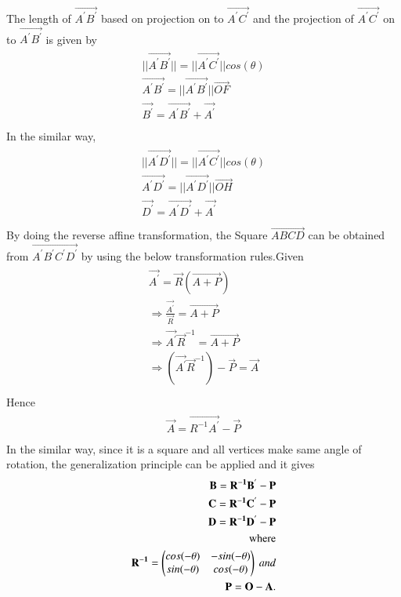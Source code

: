 \documentclass[journal,12pt,twocolumn]{IEEEtran}
\begin{document}
\\
\\
The length of $\vec{A^{'}B^{'}}$ based on projection on to $\vec{A^{'}C^{'}}$ and the projection of $\vec{A^{'}C^{'}}$ on to $\vec{A^{'}B^{'}}$ is given by \\
\begin{align}
\begin{split}
||\vec{A^{'}B^{'}}|| = ||\vec{A^{'}C^{'}}||cos(\theta)\\
\vec{A^{'}B^{'}} = ||\vec{A^{'}B^{'}}||\vec{OF}\\
\vec{B^{'}}=\vec{A^{'}B^{'}}+\vec{A^{'}}\\
\end{split}
\end{align}
In the similar way, 
\begin{align}
\begin{split}
||\vec{A^{'}D^{'}}|| = ||\vec{A^{'}C^{'}}||cos(\theta)\\
\vec{A^{'}D^{'}} = ||\vec{A^{'}D^{'}}||\vec{OH}\\
\vec{D^{'}}=\vec{A^{'}D^{'}}+\vec{A^{'}}\\
\end{split}
\end{align}
By doing the reverse affine transformation, the Square $\vec{ABCD}$ can be obtained from $\vec{A^{'}B^{'}C^{'}D^{'}}$ by using the below transformation rules.Given\\
\begin{align}
\begin{split}
\vec{A^{'}} = \vec{R}(\vec{A+P})\\
\Rightarrow \frac{\vec{A^{'}}}{\vec{R}} = \vec{A+P}\\
\Rightarrow \vec{A^{'}}\vec{R}^{-1} = \vec{A+P}\\
\Rightarrow (\vec{A^{'}}\vec{R}^{-1})-\vec{P} = \vec{A}\\
\end{split}
\end{align}
Hence\\
\begin{align}
\begin{split}
\vec{A} = \vec{R^{-1}A^{'}}-\vec{P}\\
\end{split}
\end{align}
In the similar way, since it is a square and all vertices make same angle of rotation, the generalization principle can be applied and it gives\\
\begin{align}
\begin{split}
\mathbf{B} = \mathbf{R^{-1}B^{'}}-\mathbf{P}\\
\mathbf{C} = \mathbf{R^{-1}C^{'}}-\mathbf{P}\\
\mathbf{D} = \mathbf{R^{-1}D^{'}}-\mathbf{P}\\
\text{where}\\
\mathbf{R^{-1}} = \begin{pmatrix}cos(-\theta)& -sin(-\theta)\\sin(-\theta)&cos(-\theta)\end{pmatrix} \ and\\
\mathbf{P} = \mathbf{O} - \mathbf{A}.\\
\end{split}
\end{align}
\end{document}
